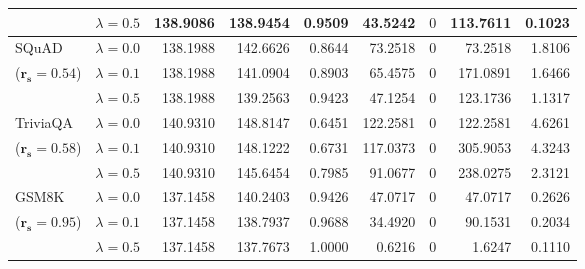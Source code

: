 \begin{table}[t]
{\begin{tabular}{l l rrrrrrr}
 & $\lambda{=}0.5$ & 138.9086 & 138.9454 & 0.9509 & 43.5242 & \cellcolor{cyan!12} $0$ & 113.7611 & 0.1023 \\
\midrule
SQuAD & $\lambda{=}0.0$ & 138.1988 & 142.6626 & \cellcolor{red!18} 0.8644 & \cellcolor{red!18} 73.2518 & \cellcolor{cyan!12} $0$ & \cellcolor{red!18} 73.2518 & \cellcolor{red!18} 1.8106 \\
{\small ($\mathbf{r_s{=}0.54}$)} & $\lambda{=}0.1$ & 138.1988 & 141.0904 & \cellcolor{red!18} 0.8903 & \cellcolor{red!18} 65.4575 & \cellcolor{cyan!12} $0$ & \cellcolor{red!18} 171.0891 & \cellcolor{red!18} 1.6466 \\
 & $\lambda{=}0.5$ & 138.1988 & 139.2563 & \cellcolor{red!18} 0.9423 & \cellcolor{red!18} 47.1254 & \cellcolor{cyan!12} $0$ & \cellcolor{red!18} 123.1736 & \cellcolor{red!18} 1.1317 \\
\midrule
TriviaQA & $\lambda{=}0.0$ & 140.9310 & 148.8147 & \cellcolor{red!35} 0.6451 & \cellcolor{red!35} 122.2581 & \cellcolor{cyan!12} $0$ & \cellcolor{red!35} 122.2581 & \cellcolor{red!35} 4.6261 \\
{\small ($\mathbf{r_s{=}0.58}$)} & $\lambda{=}0.1$ & 140.9310 & 148.1222 & \cellcolor{red!35} 0.6731 & \cellcolor{red!35} 117.0373 & \cellcolor{cyan!12} $0$ & \cellcolor{red!35} 305.9053 & \cellcolor{red!35} 4.3243 \\
 & $\lambda{=}0.5$ & 140.9310 & 145.6454 & \cellcolor{red!35} 0.7985 & \cellcolor{red!35} 91.0677 & \cellcolor{cyan!12} $0$ & \cellcolor{red!35} 238.0275 & \cellcolor{red!35} 2.3121 \\
\midrule
GSM8K & $\lambda{=}0.0$ & 137.1458 & 140.2403 & \cellcolor{red!18} 0.9426 & \cellcolor{red!18} 47.0717 & \cellcolor{cyan!12} $0$ & \cellcolor{red!18} 47.0717 & \cellcolor{red!18} 0.2626 \\
{\small ($\mathbf{r_s{=}0.95}$)} & $\lambda{=}0.1$ & 137.1458 & 138.7937 & 0.9688 & 34.4920 & \cellcolor{cyan!12} $0$ & 90.1531 & 0.2034 \\
 & $\lambda{=}0.5$ & 137.1458 & 137.7673 & 1.0000 & 0.6216 & \cellcolor{cyan!12} $0$ & 1.6247 & 0.1110 \\
\bottomrule
\end{tabular}}
\end{table}